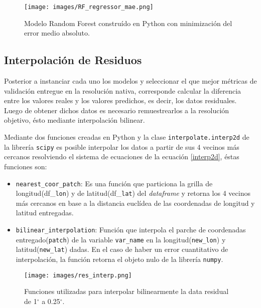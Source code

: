 \begin{figure}[H]
    \centering
          \texttt{[image: images/RF\_regressor\_mae.png]}
          \vskip -0.1in
    \caption[Construcción y entrenamiento del modelo Random Forest con criterio de \textit{mae}]{\footnotesize Modelo Random Forest construído en Python con minimización del error medio absoluto.}
    \label{logo3}
\end{figure}

    \subsection{Interpolación de Residuos}

    Posterior a instanciar cada uno los modelos y seleccionar el que mejor métricas de validación entregue en la resolución nativa, corresponde calcular la diferencia entre los valores reales y los valores predichos, es decir, los datos residuales.
    Luego de obtener dichos datos es necesario remuestrearlos a la resolución objetivo, ésto mediante interpolación bilinear.
 
    Mediante dos funciones creadas en Python y la clase \texttt{interpolate.interp2d} de la librería \texttt{scipy} es posible interpolar los datos a partir de sus 4 vecinos más cercanos resolviendo el sistema de ecuaciones
    de la ecuación \ref{interp2d}, éstas funciones son:
    \begin{itemize}
        \item {\texttt{nearest\_coor\_patch}: Es una función que particiona la grilla de longitud(df\_\texttt{lon}) y de latitud(df\_\texttt{lat}) del \textit{dataframe} y retorna los 4 vecinos más cercanos en base a la distancia euclídea
        de las coordenadas de longitud y latitud entregadas.}
        \item {\texttt{bilinear\_interpolation}: Función que interpola el parche de coordenadas entregado(\texttt{patch}) de la variable \texttt{var\_name} en la longitud(\texttt{new\_lon}) y latitud(\texttt{new\_lat}) dadas. En el caso de haber un error cuantitativo de interpolación,
         la función retorna el objeto nulo de la librería \texttt{numpy}.}
    \end{itemize}
    \begin{figure}[H]
        \centering
              \texttt{[image: images/res\_interp.png]}
              \vskip -0.1in
        \caption[Funciones utilizadas para la interpolación de residuos]{\footnotesize Funciones utilizadas para interpolar bilinearmente la data residual de 1$^{\circ}$ a 0.25$^{\circ}$.}
        \label{logo4}
    \end{figure}

